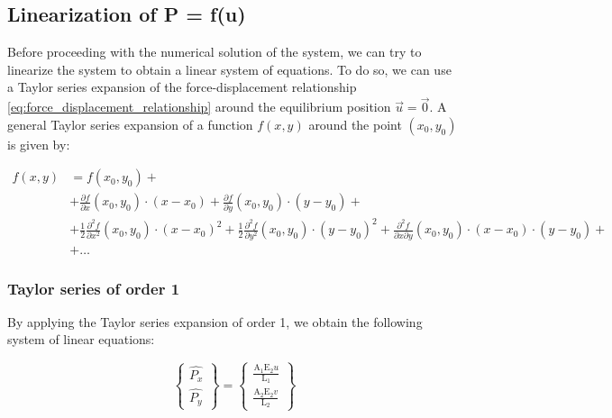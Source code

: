 \subsection{Linearization of P = f(u)}
\label{subsec:linearization}

Before proceeding with the numerical solution of the system, we can try to linearize the system to obtain a linear system of equations.
To do so, we can use a Taylor series expansion of the force-displacement relationship \ref{eq:force_displacement_relationship} around the equilibrium position $\vec{u} = \vec{0}$.
A general Taylor series expansion of a function $f(x, y)$ around the point $(x_0, y_0)$ is given by:

\begin{align}
    f(x, y) & = f(x_0, y_0) + \nonumber                                                                                                                                                                                                                                  \\
            & + \frac{\partial f}{\partial x}(x_0, y_0) \cdot (x - x_0) + \frac{\partial f}{\partial y}(x_0, y_0) \cdot (y - y_0) + \nonumber                                                                                                                            \\
            & + \frac{1}{2} \frac{\partial^2 f}{\partial x^2}(x_0, y_0) \cdot (x - x_0)^2 + \frac{1}{2} \frac{\partial^2 f}{\partial y^2}(x_0, y_0) \cdot (y - y_0)^2 + \frac{\partial^2 f}{\partial x \partial y}(x_0, y_0) \cdot (x - x_0) \cdot (y - y_0) + \nonumber \\
            & + \dots
    \label{eq:taylor_series_expansion}
\end{align}


\subsubsection{Taylor series of order 1}

By applying the Taylor series expansion of order 1, we obtain the following system of linear equations:

\begin{equation}
    \begin{Bmatrix}
        \widehat{P_x} \\
        \widehat{P_y}
    \end{Bmatrix}
    =
    \begin{Bmatrix}
        \frac{\text{A}_1 \text{E}_2 u}{\text{L}_1} \\
        \frac{\text{A}_2 \text{E}_2 v}{\text{L}_2}
    \end{Bmatrix}
    \label{eq:taylor_series_expansion_order_1}
\end{equation}


